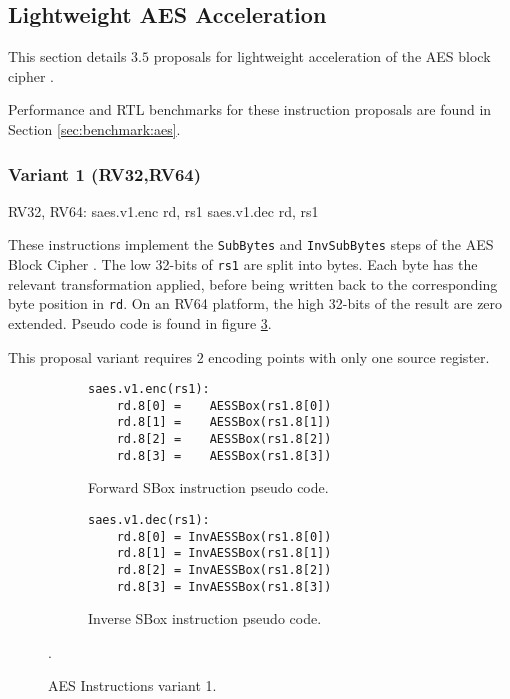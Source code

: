 
\newpage
\subsection{Lightweight AES Acceleration}

This section details $3.5$ proposals for lightweight acceleration of
the AES block cipher \cite{nist:fips:197}.

Performance and RTL benchmarks for these
instruction proposals are found in Section
\ref{sec:benchmark:aes}.


\subsubsection{Variant 1 (RV32,RV64)}

\begin{cryptoisa}
RV32, RV64:
    saes.v1.enc rd, rs1
    saes.v1.dec rd, rs1
\end{cryptoisa}

These instructions implement the 
{\tt SubBytes} \cite[Section 5.1.1]{nist:fips:197}
and
{\tt InvSubBytes} \cite[Section 5.3.1]{nist:fips:197}
steps of the AES Block Cipher \cite{nist:fips:197}.
The low 32-bits of {\tt rs1} are split into bytes.
Each byte has the relevant transformation applied, before
being written back to the corresponding byte position in {\tt rd}.
On an RV64 platform, the high 32-bits of the result are zero
extended.
Pseudo code is found in figure
\ref{fig:pseudo:aes:v1}.

This proposal variant requires $2$ encoding points with only one
source register.

\begin{figure}
\begin{subfigure}[b]{0.5\textwidth}
\begin{lstlisting}
saes.v1.enc(rs1):
    rd.8[0] =    AESSBox(rs1.8[0])
    rd.8[1] =    AESSBox(rs1.8[1])
    rd.8[2] =    AESSBox(rs1.8[2])
    rd.8[3] =    AESSBox(rs1.8[3])
\end{lstlisting}
\caption{Forward SBox instruction pseudo code.}
\label{fig:pseudo:aes:v1:sub:enc}
\end{subfigure}
\begin{subfigure}[b]{0.5\textwidth}
\begin{lstlisting}
saes.v1.dec(rs1):
    rd.8[0] = InvAESSBox(rs1.8[0])
    rd.8[1] = InvAESSBox(rs1.8[1])
    rd.8[2] = InvAESSBox(rs1.8[2])
    rd.8[3] = InvAESSBox(rs1.8[3])
\end{lstlisting}
\label{fig:pseudo:aes:v1:sub:dec}
\caption{Inverse SBox instruction pseudo code.}
\end{subfigure}
\caption{AES Instructions variant 1.}
\label{fig:pseudo:aes:v1}.
\end{figure}

